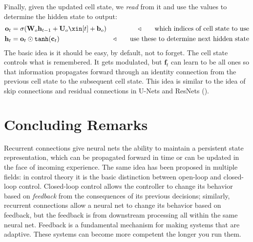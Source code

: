 Finally, given the updated cell state, we \textit{read} from it and use the values to determine the hidden state to output:
\begin{align}
    \mathbf{o}_t &= \sigma(\mathbf{W}_o\mathbf{h}_{t-1} + \mathbf{U}_o\xin[t] + \mathbf{b}_o) &\triangleleft \quad\quad\text{which indices of cell state to use}\\
    \mathbf{h}_t &= \mathbf{o}_t \odot \texttt{tanh}(\mathbf{c}_t) &\triangleleft \quad\quad\text{use these to determine next hidden state}
\end{align}
The basic idea is it should be easy, by default, not to forget. The cell state controls what is remembered. It gets modulated, but $\mathbf{f}_t$ can learn to be all ones so that information propagates forward through an identity connection from the previous cell state to the subsequent cell state. This idea is similar to the idea of skip connections and residual connections in U-Nets and ResNets (\chap{\ref{chapter:convolutional_neural_nets}}).


\section{Concluding Remarks}
Recurrent connections give neural nets the ability to maintain a persistent state representation, which can be propagated forward in time or can be updated in the face of incoming experience. The same idea has been proposed in multiple fields: in control theory it is the basic distinction between open-loop and closed-loop control. %
Closed-loop control allows the controller to change its behavior based on \textit{feedback} from the consequences of its previous decisions; similarly, recurrent connections allow a neural net to change its behavior based on feedback, but the feedback is from downstream processing all within the same neural net. Feedback is a fundamental mechanism for making systems that are adaptive. These systems can become more competent the longer you run them.
